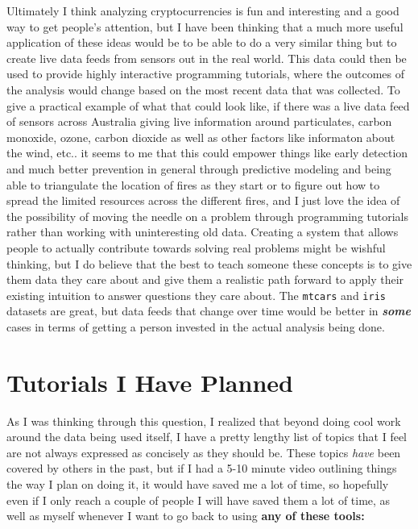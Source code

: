 \documentclass[
]{book}
\begin{document}
Ultimately I think analyzing cryptocurrencies is fun and interesting and a good way to get people's attention, but I have been thinking that a much more useful application of these ideas would be to be able to do a very similar thing but to create live data feeds from sensors out in the real world. This data could then be used to provide highly interactive programming tutorials, where the outcomes of the analysis would change based on the most recent data that was collected. To give a practical example of what that could look like, if there was a live data feed of sensors across Australia giving live information around particulates, carbon monoxide, ozone, carbon dioxide as well as other factors like informaton about the wind, etc.. it seems to me that this could empower things like early detection and much better prevention in general through predictive modeling and being able to triangulate the location of fires as they start or to figure out how to spread the limited resources across the different fires, and I just love the idea of the possibility of moving the needle on a problem through programming tutorials rather than working with uninteresting old data. Creating a system that allows people to actually contribute towards solving real problems might be wishful thinking, but I do believe that the best to teach someone these concepts is to give them data they care about and give them a realistic path forward to apply their existing intuition to answer questions they care about. The \texttt{mtcars} and \texttt{iris} datasets are great, but data feeds that change over time would be better in \textbf{\emph{some}} cases in terms of getting a person invested in the actual analysis being done.

\hypertarget{tutorials-planned}{%
\section{Tutorials I Have Planned}\label{tutorials-planned}}

As I was thinking through this question, I realized that beyond doing cool work around the data being used itself, I have a pretty lengthy list of topics that I feel are not always expressed as concisely as they should be. These topics \emph{have} been covered by others in the past, but if I had a 5-10 minute video outlining things the way I plan on doing it, it would have saved me a lot of time, so hopefully even if I only reach a couple of people I will have saved them a lot of time, as well as myself whenever I want to go back to using \textbf{any of these tools:}
\end{document}
